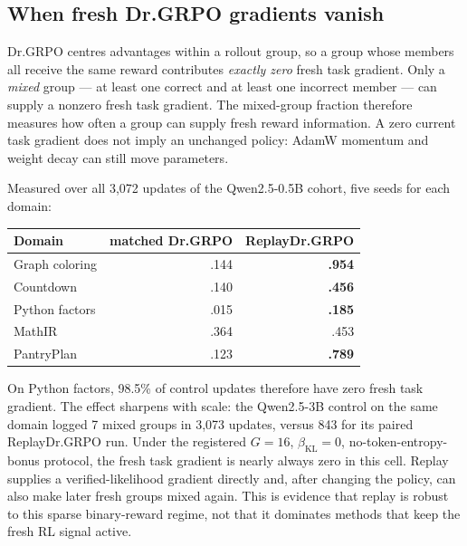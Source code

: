 \subsection{When fresh Dr.GRPO gradients vanish}
\label{app:degenerate-groups}

Dr.GRPO centres advantages within a rollout group, so a group whose members all
receive the same reward contributes \emph{exactly zero} fresh task gradient.
Only a \emph{mixed} group --- at least one correct and at least one incorrect
member --- can supply a nonzero fresh task gradient. The mixed-group fraction
therefore measures how often a group can supply fresh reward information.
A zero current task gradient does not imply an unchanged policy: AdamW momentum
and weight decay can still move parameters.

Measured over all 3{,}072 updates of the Qwen2.5-0.5B cohort, five seeds
for each domain:

\begin{center}
\small
\begin{tabular}{@{}lrr@{}}
\toprule
\textbf{Domain} & \textbf{matched Dr.GRPO} & \textbf{ReplayDr.GRPO} \\
\midrule
Graph coloring & .144 & \textbf{.954} \\
Countdown      & .140 & \textbf{.456} \\
Python factors & .015 & \textbf{.185} \\
MathIR         & .364 & .453 \\
PantryPlan     & .123 & \textbf{.789} \\
\bottomrule
\end{tabular}
\end{center}

On Python factors, 98.5\% of control updates therefore have zero
fresh task gradient. The effect sharpens with scale: the Qwen2.5-3B control
on the same domain logged 7 mixed groups in 3{,}073 updates, versus 843 for its
paired ReplayDr.GRPO run. Under the registered \(G=16\),
\(\beta_{\mathrm{KL}}=0\), no-token-entropy-bonus protocol, the fresh task gradient
is nearly always zero in this cell. Replay supplies a verified-likelihood
gradient directly and, after changing the policy, can also make later fresh
groups mixed again. This is evidence that replay is robust to this sparse
binary-reward regime, not that it dominates methods that keep the fresh RL
signal active.


